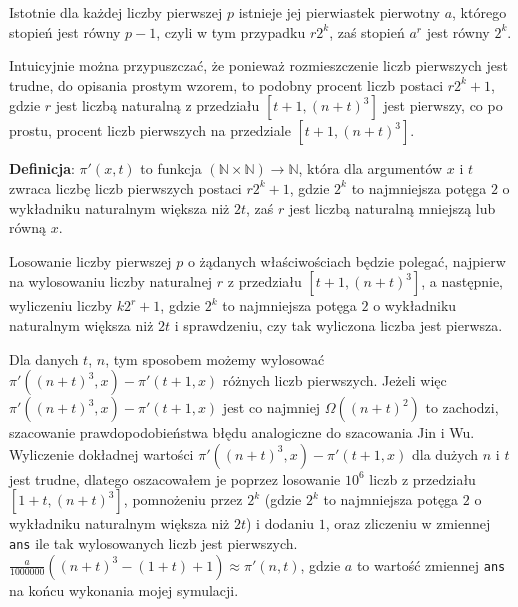 \documentclass{article}
\begin{document}
Istotnie dla każdej liczby pierwszej $p$ istnieje jej pierwiastek pierwotny $a$,
którego stopień jest równy $p-1$, czyli w tym przypadku $r2^k$, zaś stopień $a^r$ jest równy $2^k$.


Intuicyjnie można przypuszczać, że ponieważ rozmieszczenie liczb pierwszych jest trudne, 
do opisania prostym wzorem, to podobny procent liczb postaci $r2^k+1$, gdzie $r$ jest liczbą
naturalną z przedziału $[t+1,(n+t)^3]$ jest pierwszy, co po prostu, procent liczb 
pierwszych na przedziale $[t+1,(n+t)^3]$. 

\begin{tcolorbox}
    \textbf{Definicja}: $\pi'(x,t)$ to funkcja $(\mathbb{N} \times \mathbb{N}) \to \mathbb{N}$, która dla argumentów $x$ i
    $t$ zwraca liczbę liczb pierwszych postaci $r2^k+1$, gdzie $2^k$ to najmniejsza potęga $2$ o wykładniku naturalnym
    większa niż $2t$, zaś $r$ jest liczbą naturalną mniejszą lub równą $x$.
\end{tcolorbox}

Losowanie liczby pierwszej $p$ o żądanych właściwościach będzie polegać, najpierw na wylosowaniu liczby naturalnej $r$
z przedziału $[t+1,(n+t)^3]$, a następnie, wyliczeniu liczby $k2^r+1$, gdzie $2^k$ to najmniejsza potęga $2$ o wykładniku naturalnym większa niż $2t$ i sprawdzeniu, czy 
tak wyliczona liczba jest pierwsza.

Dla danych $t$, $n$, tym sposobem możemy wylosować $\pi'((n+t)^3,x)-\pi'(t+1,x)$ różnych liczb pierwszych. Jeżeli 
więc $\pi'((n+t)^3,x)-\pi'(t+1,x)$ jest co najmniej $\Omega((n+t)^2)$ to zachodzi, szacowanie prawdopodobieństwa błędu analogiczne do szacowania 
Jin i Wu. Wyliczenie dokładnej wartości $\pi'((n+t)^3,x)-\pi'(t+1,x)$ dla dużych $n$ i $t$ jest trudne, 
dlatego oszacowałem je poprzez losowanie $10^6$ liczb z przedziału $[1+t,(n+t)^3]$, pomnożeniu przez $2^k$ (gdzie $2^k$ to najmniejsza potęga $2$ o wykładniku naturalnym
większa niż $2t$) i dodaniu $1$, oraz zliczeniu w zmiennej \texttt{ans} ile tak wylosowanych liczb jest pierwszych. 
$\frac{a}{1000000}((n+t)^3-(1+t)+1) \approx \pi'(n,t)$, gdzie $a$ to wartość zmiennej \texttt{ans} na końcu wykonania mojej symulacji.
\end{document}
